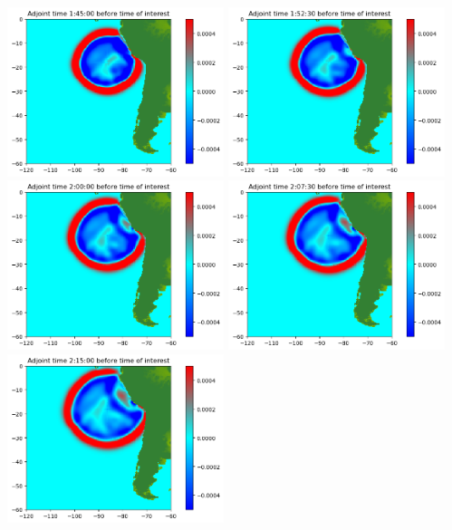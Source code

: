 \documentclass[11pt]{article}
\begin{document}
\vskip 10pt 
\includegraphics[width=0.475\textwidth]{frame0014fig0.png}
\vskip 10pt 
\includegraphics[width=0.475\textwidth]{frame0015fig0.png}
\vskip 10pt 
\includegraphics[width=0.475\textwidth]{frame0016fig0.png}
\vskip 10pt 
\includegraphics[width=0.475\textwidth]{frame0017fig0.png}
\vskip 10pt 
\includegraphics[width=0.475\textwidth]{frame0018fig0.png}
\end{document}
